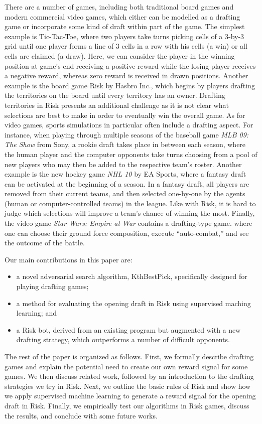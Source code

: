 \documentclass[letterpaper]{article}
\numberwithin{equation}{section}
\numberwithin{theorem}{section}
\numberwithin{lemma}{section}
\numberwithin{df}{section}
\begin{document}
There are a number of games, including both traditional board games and modern commercial video games, which either can be modelled as a drafting game or incorporate some kind of draft within part of the game.  The simplest example is Tic-Tac-Toe, where two players take turns picking cells of a 3-by-3 grid until one player forms a line of 3 cells in a row with his cells (a win) or all cells are claimed (a draw).  Here, we can consider the player in the winning position at game's end receiving a positive reward while the losing player receives a negative reward, whereas zero reward is received in drawn positions.  Another example is the board game Risk by Hasbro Inc., which begins by players drafting the territories on the board until every territory has an owner.  Drafting territories in Risk presents an additional challenge as it is not clear what selections are best to make in order to eventually win the overall game.  As for video games, sports simulations in particular often include a drafting aspect.  For instance, when playing through multiple seasons of the baseball game \textit{MLB 09: The Show} from Sony, a rookie draft takes place in between each season, where the human player and the computer opponents take turns choosing from a pool of new players who may then be added to the respective team's roster.  Another example is the new hockey game \textit{NHL 10} by EA Sports, where a fantasy draft can be activated at the beginning of a season.  In a fantasy draft, all players are removed from their current teams, and then selected one-by-one by the agents (human or computer-controlled teams) in the league.  Like with Risk, it is hard to judge which selections will improve a team's chance of winning the most.  Finally, the video game \textit{Star Wars: Empire at War} contains a drafting-type game. where one can choose their ground force composition, execute ``auto-combat,'' and see the outcome of the battle.

Our main contributions in this paper are:
\begin{itemize}
	\item a novel adversarial search algorithm, KthBestPick, specifically designed for playing drafting games;
	\item a method for evaluating the opening draft in Risk using supervised maching learning; and
	\item a Risk bot, derived from an existing program but augmented with a new drafting strategy, which outperforms a number of difficult opponents.
\end{itemize}
The rest of the paper is organized as follows.  First, we formally describe drafting games and explain the potential need to create our own reward signal for some games.  We then discuss related work, followed by an introduction to the drafting strategies we try in Risk.  Next, we outline the basic rules of Risk and show how we apply supervised machine learning to generate a reward signal for the opening draft in Risk.  Finally, we empirically test our algorithms in Risk games, discuss the results, and conclude with some future works.
\end{document}
